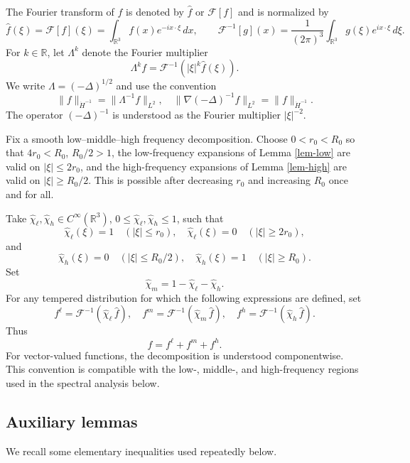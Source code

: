 \documentclass[10pt,reqno]{amsart}
\numberwithin{equation}{section}
\begin{document}
The Fourier transform of $f$ is denoted by $\widehat f$ or
$\mathscr F[f]$ and is normalized by
\[
 \widehat f(\xi)
 =\mathscr F[f](\xi)
 =\int_{\mathbb R^3}f(x)e^{-ix\cdot\xi}\,dx,
 \qquad
 \mathscr F^{-1}[g](x)
 =\frac1{(2\pi)^3}\int_{\mathbb R^3}g(\xi)e^{ix\cdot\xi}\,d\xi.
\]
For $k\in\mathbb{R}$, let $\Lambda^k$ denote the Fourier multiplier
\[%
\Lambda^k f =\mathscr F^{-1}\!\left(|\xi|^k\widehat f(\xi)\right).
\]%
We write
$\Lambda=(-\Delta)^{1/2}$ and use the convention
\[
\|f\|_{\dot H^{-1}}=\|\Lambda^{-1}f\|_{L^2},
\quad
\|\nabla(-\Delta)^{-1}f\|_{L^2}=\|f\|_{\dot H^{-1}}.
\]
The operator $(-\Delta)^{-1}$ is understood as the Fourier multiplier $|\xi|^{-2}$.


Fix a smooth low--middle--high frequency decomposition. Choose $0<r_0<R_0$ so that $4r_0<R_0$, $R_0/2>1$, the low-frequency expansions of Lemma \ref{lem-low} are valid on $|\xi|\le 2r_0$, and the high-frequency expansions of Lemma \ref{lem-high} are valid on $|\xi|\ge R_0/2$.  This is possible after decreasing $r_0$ and increasing $R_0$ once and for all.

Take $\widehat\chi_\ell,\widehat\chi_h\in
C^\infty(\mathbb{R}^3)$, $0\leq\widehat\chi_\ell,\widehat\chi_h\leq1$, such that
\[
\widehat\chi_\ell(\xi)=1\quad (|\xi|\leq r_0),
\quad
\widehat\chi_\ell(\xi)=0\quad (|\xi|\geq2r_0),
\]
and
\[
\widehat\chi_h(\xi)=0\quad (|\xi|\leq R_0/2),
\quad
\widehat\chi_h(\xi)=1\quad (|\xi|\geq R_0).
\]
Set
\[
\widehat\chi_m=1-\widehat\chi_\ell-\widehat\chi_h.
\]
For any tempered distribution for which the following expressions are defined, set
\[ 
f^\ell=\mathscr F^{-1}\!\left(\widehat\chi_\ell\,\widehat f\right),
\quad
f^m=\mathscr F^{-1}\!\left(\widehat\chi_m\,\widehat f\right),
\quad
f^h=\mathscr F^{-1}\!\left(\widehat\chi_h\,\widehat f\right).
\] 
Thus
\[
f=f^\ell+f^m+f^h.
\]
For vector-valued functions, the decomposition is understood componentwise. This convention is compatible with the low-, middle-, and high-frequency regions used in the spectral analysis below.


%
%
%
%
%
%


\subsection{Auxiliary lemmas}

We recall some elementary inequalities used repeatedly below.
\end{document}

